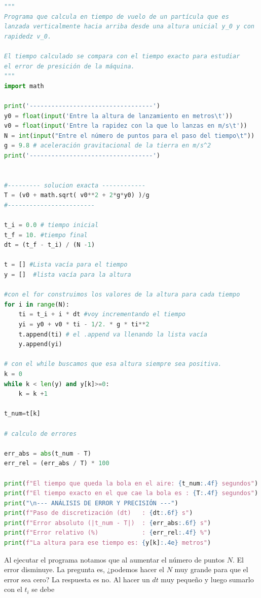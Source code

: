 \documentclass[12pt]{article}
\begin{document}
\begin{lstlisting}[language=Python, captionpos=t, title=\texttt{tiempo\_vuelo.py}]
"""
Programa que calcula en tiempo de vuelo de un partícula que es 
lanzada verticalmente hacia arriba desde una altura unicial y_0 y con
rapidedz v_0.

El tiempo calculado se compara con el tiempo exacto para estudiar 
el error de presición de la máquina.
"""    
import math 

print('----------------------------------')
y0 = float(input('Entre la altura de lanzamiento en metros\t'))
v0 = float(input('Entre la rapidez con la que lo lanzas en m/s\t'))
N = int(input("Entre el número de puntos para el paso del tiempo\t")) 
g = 9.8 # aceleración gravitacional de la tierra en m/s^2
print('----------------------------------')


#--------- solucion exacta ------------
T = (v0 + math.sqrt( v0**2 + 2*g*y0) )/g
#------------------------

t_i = 0.0 # tiempo inicial
t_f = 10. #tiempo final
dt = (t_f - t_i) / (N -1)

t = [] #Lista vacía para el tiempo
y = []  #lista vacía para la altura

#con el for construimos los valores de la altura para cada tiempo
for i in range(N):
    ti = t_i + i * dt #voy incrementando el tiempo
    yi = y0 + v0 * ti - 1/2. * g * ti**2
    t.append(ti) # el .append va llenando la lista vacía
    y.append(yi)

# con el while buscamos que esa altura siempre sea positiva. 
k = 0
while k < len(y) and y[k]>=0:
    k = k +1

t_num=t[k]

# calculo de errores

err_abs = abs(t_num - T)
err_rel = (err_abs / T) * 100    

print(f"El tiempo que queda la bola en el aire: {t_num:.4f} segundos")
print(f"El tiempo exacto en el que cae la bola es : {T:.4f} segundos")
print("\n--- ANÁLISIS DE ERROR Y PRECISIÓN ---")
print(f"Paso de discretización (dt)   : {dt:.6f} s")
print(f"Error absoluto (|t_num - T|)  : {err_abs:.6f} s")
print(f"Error relativo (%)            : {err_rel:.4f} %")
print(f"La altura para ese tiempo es: {y[k]:.4e} metros")
\end{lstlisting}
Al ejecutar el programa notamos que al aumentar el número de puntos $N$. El error
disminuye. La pregunta es, ¿podemos hacer el $N$ muy grande para que el error sea cero?
La respuesta es no. Al hacer un $dt$ muy pequeño y luego sumarlo con el $t_i$ se debe 
\end{document}

